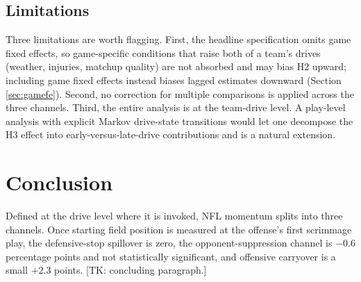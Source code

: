 \documentclass[11pt]{article}
\begin{document}
\subsection{Limitations}\label{sec:limits}

Three limitations are worth flagging. First, the headline specification
omits game fixed effects, so game-specific conditions that raise both of a
team's drives (weather, injuries, matchup quality) are not absorbed and may
bias H2 upward; including game fixed effects instead biases lagged
estimates downward (Section \ref{sec:gamefe}). Second, no correction for
multiple comparisons is applied across the three channels. Third, the
entire analysis is at the team-drive level. A
play-level analysis with explicit Markov drive-state transitions
\citep{goldner2012markov} would let one decompose the H3 effect into
early-versus-late-drive contributions and is a natural extension.

\section{Conclusion}\label{sec:concl}

Defined at the drive level where it is invoked, NFL momentum splits
into three channels. Once starting field position is measured at the
offense's first scrimmage play, the defensive-stop spillover is zero, the
opponent-suppression channel is $-0.6$ percentage points and not
statistically significant, and offensive carryover is a small $+2.3$
points. [TK: concluding paragraph.]



\end{document}
